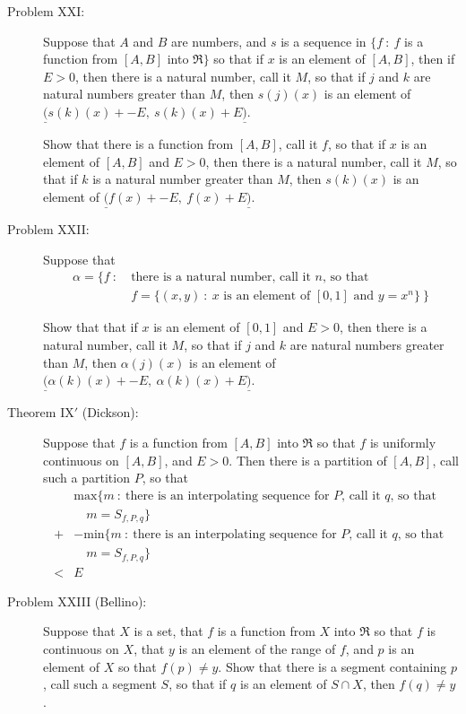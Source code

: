 \documentclass{article}
\begin{document}
\begin{description}
  \item[Problem XXI:] Suppose that $A$ and $B$ are numbers, and $s$ is a sequence in $\{ f\ :\ f$ is a function from $[A,B]$ into $\Re \}$ so that if $x$ is an element of $[A,B]$, then if $E > 0$, then there is a natural number, call it $M$, so that if $j$ and $k$ are natural numbers greater than $M$, then $s(j)(x)$ is an element of $\underline{(} s(k)(x) + -E,\ s(k)(x) + E \underline{)}$. 
  
    Show that there is a function from $[A,B]$, call it $f$, so that if $x$ is an element of $[A,B]$ and $E > 0$, then there is a natural number, call it $M$, so that if $k$ is a natural number greater than $M$, then $s(k)(x)$ is an element of $\underline{(} f(x) + -E,\ f(x) + E \underline{)}$.

  \item[Problem XXII:] Suppose that
    \begin{align*}
    \alpha = \{ f\ :\ & \text{there is a natural number, call it $n$, so that } \\
                      & f = \{ (x,y)\ :\ x \text{ is an element of $[0,1]$ and } y = x^n \} \ \}
    \end{align*}
  
    Show that that if $x$ is an element of $[0,1]$ and $E > 0$, then there is a natural number, call it $M$, so that if $j$ and $k$ are natural numbers greater than $M$, then $\alpha(j)(x)$ is an element of $\underline{(} \alpha(k)(x) + -E,\ \alpha(k)(x) + E \underline{)}$.

  \item[Theorem IX$'$ (Dickson):] Suppose that $f$ is a function from $[A,B]$ into $\Re$ so that $f$ is uniformly continuous on $[A,B]$, and $E > 0$. Then there is a partition of $[A,B]$, call such a partition $P$, so that 
    \begin{align*}
    \ & \text{max} \{ m\ :\  \text{there is an interpolating sequence for $P$, call it $q$, so that } \\
      & \quad m = S_{f,P,q} \} \\
    + & -\text{min} \{ m\ :\ \text{there is an interpolating sequence for $P$, call it $q$, so that } \\
      & \quad m = S_{f,P,q} \} \\
    < & E
    \end{align*}

  \item[Problem XXIII (Bellino):] Suppose that $X$ is a set, that $f$ is a function from $X$ into $\Re$ so that $f$ is continuous on $X$, that $y$ is an element of the range of $f$, and $p$ is an element of $X$ so that $f(p) \neq y$. Show that there is a segment containing $p$, call such a segment $S$, so that if $q$ is an element of $S \cap X$, then $f(q) \neq y$.


\end{description}
\end{document}
